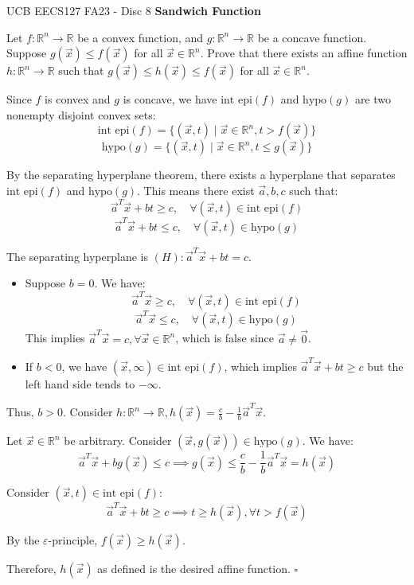 \begin{problem}{}{}{UCB EECS127 FA23 - Disc 8}
\textbf{Sandwich Function}

Let $f : \mathbb{R}^n \to \mathbb{R}$ be a convex function, and $g : \mathbb{R}^n \to \mathbb{R}$ be a concave function.
Suppose $g(\vec{x}) \le f(\vec{x})$ for all $\vec{x} \in \mathbb{R}^n$.
Prove that there exists an affine function $h : \mathbb{R}^n \to \mathbb{R}$ such that
$g(\vec{x}) \le h(\vec{x}) \le f(\vec{x})$ for all $\vec{x} \in \mathbb{R}^n$.
\end{problem}

\begin{solution}
    Since $f$ is convex and $g$ is concave, we have $\text{int epi}(f)$ and $\text{hypo}(g)$ 
    are two nonempty disjoint convex sets:
    \[ \text{int epi}(f) = \{(\vec{x}, t) \mid \vec{x} \in \mathbb{R}^n, t > f(\vec{x})\} \]
    \[ \text{hypo}(g) = \{(\vec{x}, t) \mid \vec{x} \in \mathbb{R}^n, t \le g(\vec{x})\} \]

    By the separating hyperplane theorem, there exists a hyperplane that separates $\text{int epi}(f)$ and $\text{hypo}(g)$. 
    This means there exist $\vec{a}, b, c$ such that:
    \[ \vec{a}^T\vec{x} + bt \ge c, \quad \forall (\vec{x}, t) \in \text{int epi}(f) \]
    \[ \vec{a}^T\vec{x} + bt \le c, \quad \forall (\vec{x}, t) \in \text{hypo}(g) \]

    The separating hyperplane is $(H): \vec{a}^T\vec{x} + bt = c$.

    \begin{itemize}
        \item Suppose $b = 0$. We have:
              \[ \vec{a}^T\vec{x} \ge c, \quad \forall (\vec{x}, t) \in \text{int epi}(f) \]
              \[ \vec{a}^T\vec{x} \le c, \quad \forall (\vec{x}, t) \in \text{hypo}(g) \]
              This implies $\vec{a}^T\vec{x} = c, \forall \vec{x} \in \mathbb{R}^n$, which is false since $\vec{a} \neq \vec{0}$.

        \item If $b < 0$, we have $(\vec{x}, \infty) \in \text{int epi}(f)$, 
        which implies $\vec{a}^T\vec{x} + bt \ge c$ but the left hand side tends to $-\infty$.
    \end{itemize}

    Thus, $b > 0$. Consider $h: \mathbb{R}^n \to \mathbb{R}, h(\vec{x}) = \frac{c}{b} - \frac{1}{b}\vec{a}^T\vec{x}$.

    Let $\vec{x} \in \mathbb{R}^n$ be arbitrary. Consider $(\vec{x}, g(\vec{x})) \in \text{hypo}(g)$. We have:
    \[ \vec{a}^T\vec{x} + bg(\vec{x}) \le c \implies g(\vec{x}) \le \frac{c}{b} - \frac{1}{b}\vec{a}^T\vec{x} = h(\vec{x}) \]

    Consider $(\vec{x}, t) \in \text{int epi}(f)$:
    \[ \vec{a}^T\vec{x} + bt \ge c \implies t \ge h(\vec{x}), \forall t > f(\vec{x}) \]

    By the $\varepsilon$-principle, $f(\vec{x}) \ge h(\vec{x})$.

    Therefore, $h(\vec{x})$ as defined is the desired affine function.
    \hfill $\square$ 
\end{solution}